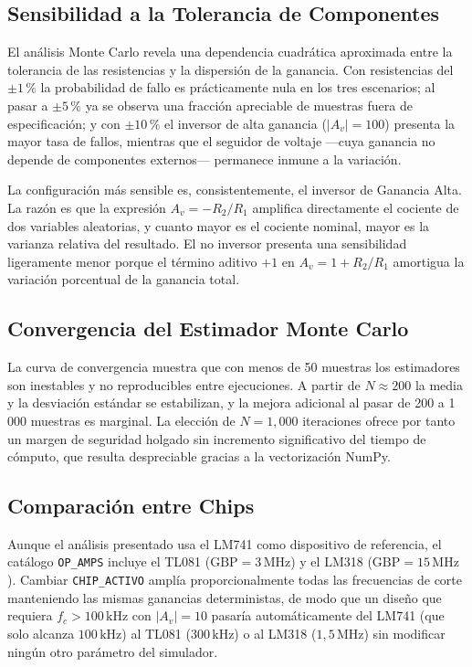 ﻿\documentclass[12pt, letterpaper]{article}
\begin{document}
\subsection{Sensibilidad a la Tolerancia de Componentes}

El análisis Monte Carlo revela una dependencia cuadrática aproximada entre
la tolerancia de las resistencias y la dispersión de la ganancia.
Con resistencias del \(\pm 1\,\text{\%}\) la probabilidad de fallo es
prácticamente nula en los tres escenarios; al pasar a \(\pm 5\,\text{\%}\)
ya se observa una fracción apreciable de muestras fuera de especificación;
y con \(\pm 10\,\text{\%}\) el inversor de alta ganancia (\(|A_v| = 100\))
presenta la mayor tasa de fallos, mientras que el seguidor de voltaje
—cuya ganancia no depende de componentes externos— permanece inmune a la
variación.

La configuración más sensible es, consistentemente, el inversor de Ganancia
Alta. La razón es que la expresión \(A_v = -R_2/R_1\) amplifica directamente
el cociente de dos variables aleatorias, y cuanto mayor es el cociente nominal,
mayor es la varianza relativa del resultado. El no inversor presenta una
sensibilidad ligeramente menor porque el término aditivo \(+1\) en
\(A_v = 1 + R_2/R_1\) amortigua la variación porcentual de la ganancia total.

\subsection{Convergencia del Estimador Monte Carlo}

La curva de convergencia muestra que con menos de 50 muestras los estimadores
son inestables y no reproducibles entre ejecuciones. A partir de
\(N \approx 200\) la media y la desviación estándar se estabilizan, y la mejora
adicional al pasar de 200 a 1\,000 muestras es marginal. La elección de
\(N = 1{,}000\) iteraciones ofrece por tanto un margen de seguridad holgado
sin incremento significativo del tiempo de cómputo, que resulta despreciable
gracias a la vectorización NumPy.

\subsection{Comparación entre Chips}

Aunque el análisis presentado usa el LM741 como dispositivo de referencia,
el catálogo \texttt{OP\_AMPS} incluye el TL081 (\(\mathrm{GBP} = 3\,\text{MHz}\))
y el LM318 (\(\mathrm{GBP} = 15\,\text{MHz}\)). Cambiar \texttt{CHIP\_ACTIVO}
amplía proporcionalmente todas las frecuencias de corte manteniendo las mismas
ganancias deterministas, de modo que un diseño que requiera \(f_c > 100\,\text{kHz}\)
con \(|A_v| = 10\) pasaría automáticamente del LM741 (que solo alcanza
\(100\,\text{kHz}\)) al TL081 (\(300\,\text{kHz}\)) o al LM318
(\(1{,}5\,\text{MHz}\)) sin modificar ningún otro parámetro del simulador.
\end{document}
